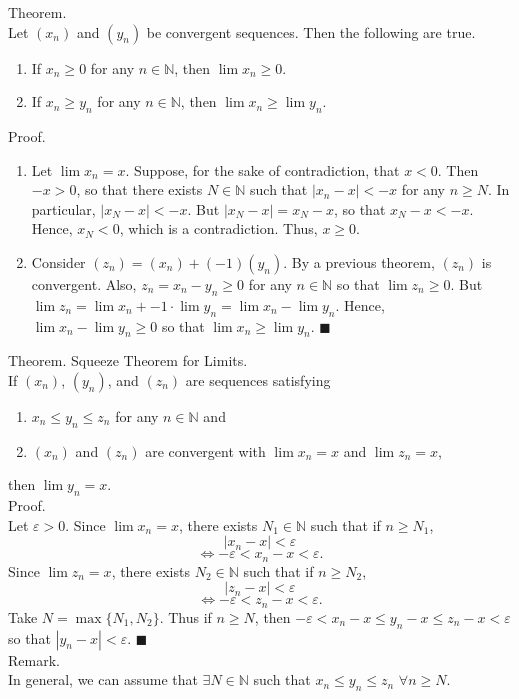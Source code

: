 \documentclass[twocolumn]{article}
\newcommand{\qed}{$\blacksquare$}
\newcommand{\br}{\vspace{\baselineskip}}
\let\eps\varepsilon
\newcommand{\naturals}{\mathbb{N}}
\begin{document}
Theorem. \\
Let $(x_n)$ and $(y_n)$ be convergent sequences. Then the following are true.
\begin{enumerate}
	\item
	If $x_n \geq 0$ for any $n \in \naturals$, then $\lim x_n \geq 0$.
	\item
	If $x_n \geq y_n$ for any $n \in \naturals$, then $\lim x_n \geq \lim y_n$.
\end{enumerate}
Proof.
\begin{enumerate}
	\item
	Let $\lim x_n = x$. Suppose, for the sake of contradiction, that $x < 0$. Then $-x > 0$, so that there exists $N \in \naturals$ such that $|x_n - x| < -x$ for any $n \geq N$. In particular, $|x_N - x| < -x$. But $|x_N - x| = x_N - x$, so that $x_N - x < -x$. Hence, $x_N < 0$, which is a contradiction. Thus, $x \geq 0$.
	\item
	Consider $(z_n) = (x_n) + (-1)(y_n)$. By a previous theorem, $(z_n)$ is convergent. Also, $z_n = x_n - y_n \geq 0$ for any $n \in \naturals$ so that $\lim z_n \geq 0$. But $\lim z_n = \lim x_n + -1 \cdot \lim y_n = \lim x_n - \lim y_n$. Hence, $\lim x_n - \lim y_n \geq 0$ so that $\lim x_n \geq \lim y_n$. \qed
\end{enumerate} \br

Theorem. Squeeze Theorem for Limits. \\
If $(x_n)$, $(y_n)$, and $(z_n)$ are sequences satisfying
\begin{enumerate}
	\item
	$x_n \leq y_n \leq z_n$ for any $n \in \naturals$ and
	\item
	$(x_n)$ and $(z_n)$ are convergent with $\lim x_n = x$ and $\lim z_n = x$,
\end{enumerate}
then $\lim y_n = x$. \\
Proof. \\
Let $\eps > 0$. Since $\lim x_n = x$, there exists $N_1 \in \naturals$ such that if $n \geq N_1$,
$$|x_n - x| < \eps$$
$$\Leftrightarrow -\eps < x_n - x < \eps \text{.}$$
Since $\lim z_n = x$, there exists $N_2 \in \naturals$ such that if $n \geq N_2$,
$$|z_n - x| < \eps$$
$$\Leftrightarrow -\eps < z_n - x < \eps \text{.}$$
Take $N = \max \{ N_1, N_2 \}$. Thus if $n \geq N$, then $-\eps < x_n - x \leq y_n - x \leq z_n - x < \eps$ so that $|y_n - x| < \eps$. \qed \\

Remark. \\
In general, we can assume that $\exists N \in \naturals$ such that $x_n \leq y_n \leq z_n$ $\forall n \geq N$. \\
\end{document}
